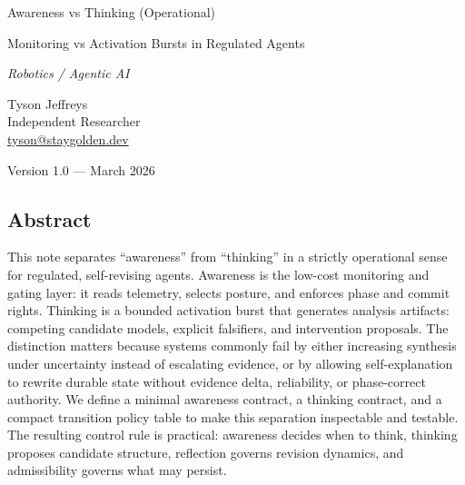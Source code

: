 \documentclass[11pt]{article}
\begin{document}
\hypersetup{pageanchor=false}
\begin{titlepage}
\thispagestyle{empty}
\raggedright

\vspace*{0.62\textheight}

{\LARGE Awareness vs Thinking (Operational)\par}
\vspace{0.25em}
{\Large Monitoring vs Activation Bursts in Regulated Agents\par}
\vspace{0.4em}
{\large\itshape Robotics / Agentic AI\par}

\vspace{1.6em}

Tyson Jeffreys\\
Independent Researcher\\
\href{mailto:tyson@staygolden.dev}{tyson@staygolden.dev}

\vspace{1.6em}

Version 1.0 --- March 2026

\end{titlepage}
\hypersetup{pageanchor=true}
\setcounter{page}{1}

\vspace{1em}

\setcounter{section}{0}

\subsection*{Abstract}
This note separates \enquote{awareness} from \enquote{thinking} in a strictly operational sense for regulated, self-revising agents. Awareness is the low-cost monitoring and gating layer: it reads telemetry, selects posture, and enforces phase and commit rights. Thinking is a bounded activation burst that generates analysis artifacts: competing candidate models, explicit falsifiers, and intervention proposals. The distinction matters because systems commonly fail by either increasing synthesis under uncertainty instead of escalating evidence, or by allowing self-explanation to rewrite durable state without evidence delta, reliability, or phase-correct authority. We define a minimal awareness contract, a thinking contract, and a compact transition policy table to make this separation inspectable and testable. The resulting control rule is practical: awareness decides when to think, thinking proposes candidate structure, reflection governs revision dynamics, and admissibility governs what may persist.
\end{document}
